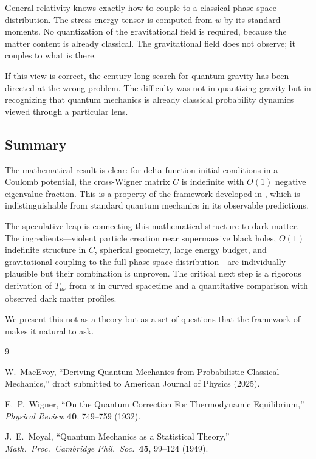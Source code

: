 \documentclass[12pt]{article}
\begin{document}
General relativity knows exactly how to couple to a classical phase-space distribution.  The stress-energy tensor is computed from $w$ by its standard moments.  No quantization of the gravitational field is required, because the matter content is already classical.  The gravitational field does not observe; it couples to what is there.

If this view is correct, the century-long search for quantum gravity has been directed at the wrong problem.  The difficulty was not in quantizing gravity but in recognizing that quantum mechanics is already classical probability dynamics viewed through a particular lens.

\subsection{Summary}

The mathematical result is clear: for delta-function initial conditions in a Coulomb potential, the cross-Wigner matrix $C$ is indefinite with $O(1)$ negative eigenvalue fraction.  This is a property of the framework developed in \cite{macevoy2025}, which is indistinguishable from standard quantum mechanics in its observable predictions.

The speculative leap is connecting this mathematical structure to dark matter.  The ingredients---violent particle creation near supermassive black holes, $O(1)$ indefinite structure in $C$, spherical geometry, large energy budget, and gravitational coupling to the full phase-space distribution---are individually plausible but their combination is unproven.  The critical next step is a rigorous derivation of $T_{\mu\nu}$ from $w$ in curved spacetime and a quantitative comparison with observed dark matter profiles.

We present this not as a theory but as a set of questions that the framework of \cite{macevoy2025} makes it natural to ask.

\begin{thebibliography}{9}

W.~MacEvoy,
``Deriving Quantum Mechanics from Probabilistic Classical Mechanics,''
draft submitted to American Journal of Physics (2025).

E.~P.~Wigner,
``On the Quantum Correction For Thermodynamic Equilibrium,''
\textit{Physical Review} \textbf{40}, 749--759 (1932).

J.~E.~Moyal,
``Quantum Mechanics as a Statistical Theory,''
\textit{Math.\ Proc.\ Cambridge Phil.\ Soc.}\ \textbf{45}, 99--124 (1949).

\end{thebibliography}
\end{document}
